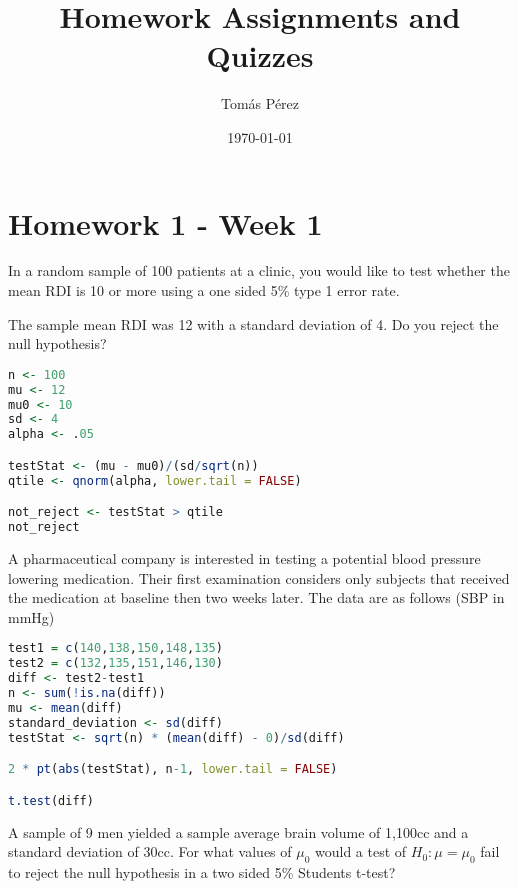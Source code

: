 \documentclass{homework}
\author{Tomás Pérez}
\date{\today}
\title{Homework Assignments and Quizzes}
\begin{document}
 \maketitle

\section{Homework 1 - Week 1}

\begin{tcolorbox}[title=Question 1]
In a  random sample of 100 patients at a clinic, you would like to test whether the mean RDI is 10 or more using a one sided 5\% type 1 error rate.

The sample mean RDI was 12 with a standard deviation of 4. Do you reject the null hypothesis?
\end{tcolorbox}

\begin{lstlisting}[language=R]
n <- 100
mu <- 12
mu0 <- 10 
sd <- 4
alpha <- .05

testStat <- (mu - mu0)/(sd/sqrt(n))
qtile <- qnorm(alpha, lower.tail = FALSE)

not_reject <- testStat > qtile 
not_reject
\end{lstlisting}

\begin{tcolorbox}[title=Question 2]
A pharmaceutical company is interested in testing a potential blood pressure lowering medication. Their first examination considers only subjects that received the medication at baseline then two weeks later. The data are as follows (SBP in mmHg)



\end{tcolorbox}

\begin{lstlisting}[language=R]
test1 = c(140,138,150,148,135)
test2 = c(132,135,151,146,130)
diff <- test2-test1
n <- sum(!is.na(diff))
mu <- mean(diff)
standard_deviation <- sd(diff)
testStat <- sqrt(n) * (mean(diff) - 0)/sd(diff)

2 * pt(abs(testStat), n-1, lower.tail = FALSE) 

t.test(diff)
\end{lstlisting}

\begin{tcolorbox}[title=Question 3]
A sample of 9 men yielded a sample average brain volume of 1,100cc and a standard deviation of 30cc. For what values of $\mu_0$ would a test of $H_0: \mu = \mu_0$  fail to reject the null hypothesis in a two sided 5\% Students t-test?
\end{tcolorbox}
\end{document}
